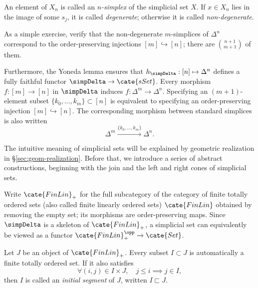 \begin{definition}\label{def:simplex}
	An element of $X_n$ is called an \emph{$n$-simplex} of the simplicial set
	$X$. If $x\in X_n$ lies in the image of some $s_j$, it is called
	\emph{degenerate}; otherwise it is called \emph{non-degenerate}.
\end{definition}

As a simple exercise, verify that the non-degenerate $m$-simplices of
$\Delta^n$ correspond to the order-preserving injections
$[m]\hookrightarrow[n]$; there are $\binom{n+1}{m+1}$ of them.

Furthermore, the Yoneda lemma ensures that
$h_{\simpDelta}:[n]\mapsto\Delta^n$ defines a fully faithful functor
$\simpDelta\to\cate{sSet}$. Every morphism $f:[m]\to[n]$ in $\simpDelta$
induces $f:\Delta^m\to\Delta^n$. Specifying an $(m+1)$-element subset
$\{k_0,\ldots,k_m\}\subset[n]$ is equivalent to specifying an
order-preserving injection $[m]\hookrightarrow[n]$. The corresponding
morphism between standard simplices is also written
\[ \Delta^m \xrightarrow{\{k_0, \ldots, k_m\}} \Delta^n . \]

The intuitive meaning of simplicial sets will be explained by geometric
realization in \S\ref{sec:geom-realization}. Before that, we introduce a
series of abstract constructions, beginning with the join and the left and
right cones of simplicial sets.

Write $\cate{FinLin}_+$ for the full subcategory of the category of finite
totally ordered sets (also called finite linearly ordered sets)
$\cate{FinLin}$ obtained by removing the empty set; its morphisms are
order-preserving maps. Since $\simpDelta$ is a skeleton of
$\cate{FinLin}_+$, a simplicial set can equivalently be viewed as a functor
$\cate{FinLin}_+^{\opp}\to\cate{Set}$.

\begin{convention}
	Let $J$ be an object of $\cate{FinLin}_+$. Every subset $I\subset J$ is
	automatically a finite totally ordered set. If it also satisfies
	\[ \forall (i, j) \in I \times J, \quad j \leq i \implies j \in I, \]
	then $I$ is called an \emph{initial segment} of $J$, written
	$I\sqsubset J$.
\end{convention}

